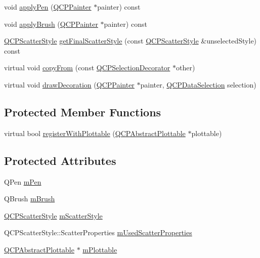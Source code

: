 \begin{DoxyCompactItemize}
void \hyperlink{class_q_c_p_selection_decorator_a75098893f7d08660ea449206810679d7}{apply\+Pen} (\hyperlink{class_q_c_p_painter}{Q\+C\+P\+Painter} $\ast$painter) const
\item 
void \hyperlink{class_q_c_p_selection_decorator_a225544527d51b49546b70d0e6d655a34}{apply\+Brush} (\hyperlink{class_q_c_p_painter}{Q\+C\+P\+Painter} $\ast$painter) const
\item 
\hyperlink{class_q_c_p_scatter_style}{Q\+C\+P\+Scatter\+Style} \hyperlink{class_q_c_p_selection_decorator_a1277b373248896bc70e8cc1de96da9fa}{get\+Final\+Scatter\+Style} (const \hyperlink{class_q_c_p_scatter_style}{Q\+C\+P\+Scatter\+Style} \&unselected\+Style) const
\item 
virtual void \hyperlink{class_q_c_p_selection_decorator_a467a8d5cfcab27e862a17c797ac27b8a}{copy\+From} (const \hyperlink{class_q_c_p_selection_decorator}{Q\+C\+P\+Selection\+Decorator} $\ast$other)
\item 
virtual void \hyperlink{class_q_c_p_selection_decorator_a4f8eb49e277063845391e803ae23054a}{draw\+Decoration} (\hyperlink{class_q_c_p_painter}{Q\+C\+P\+Painter} $\ast$painter, \hyperlink{class_q_c_p_data_selection}{Q\+C\+P\+Data\+Selection} selection)
\end{DoxyCompactItemize}
\subsection*{Protected Member Functions}
\begin{DoxyCompactItemize}
\item 
virtual bool \hyperlink{class_q_c_p_selection_decorator_af66cb39e308da0285ae5d533e1e85027}{register\+With\+Plottable} (\hyperlink{class_q_c_p_abstract_plottable}{Q\+C\+P\+Abstract\+Plottable} $\ast$plottable)
\end{DoxyCompactItemize}
\subsection*{Protected Attributes}
\begin{DoxyCompactItemize}
\item 
Q\+Pen \hyperlink{class_q_c_p_selection_decorator_a684a691c146a5bac927c0146bd28d557}{m\+Pen}
\item 
Q\+Brush \hyperlink{class_q_c_p_selection_decorator_a4e3a3a01fdec5b018c0c59a0b6ae9f70}{m\+Brush}
\item 
\hyperlink{class_q_c_p_scatter_style}{Q\+C\+P\+Scatter\+Style} \hyperlink{class_q_c_p_selection_decorator_a5b822197a1bf802c5cf8c3dc43ca549a}{m\+Scatter\+Style}
\item 
Q\+C\+P\+Scatter\+Style\+::\+Scatter\+Properties \hyperlink{class_q_c_p_selection_decorator_acb4f6af085283c9ce7d5c168fb53e855}{m\+Used\+Scatter\+Properties}
\item 
\hyperlink{class_q_c_p_abstract_plottable}{Q\+C\+P\+Abstract\+Plottable} $\ast$ \hyperlink{class_q_c_p_selection_decorator_a25250a1d29b0723c4fa59a97e62f5758}{m\+Plottable}
\end{DoxyCompactItemize}
